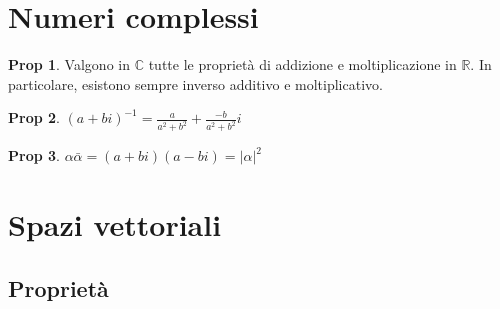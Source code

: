 \documentclass[]{article}
\theoremstyle{definition}
\theoremstyle{definition}
\newtheorem{prop}{Prop}[subsection]
\theoremstyle{definition}
\begin{document}
\section{Numeri complessi}

\begin{prop} Valgono in $\mathbb{C}$ tutte le proprietà di addizione e moltiplicazione in $\mathbb{R}$. In particolare, esistono sempre inverso additivo e moltiplicativo.

\end{prop} \begin{prop} $(a + bi)^{-1} = \frac{a}{a^2 + b^2}+\frac{-b}{a^2 + b^2}i$

\end{prop} \begin{prop} $\alpha \bar{\alpha} = (a+bi)(a-bi) = |\alpha |^2$
\end{prop}

\section{Spazi vettoriali}
\subsection{Proprietà} 
\end{document}
